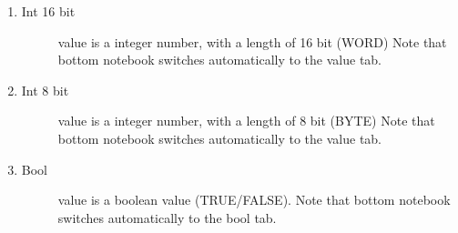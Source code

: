 \documentclass[a4paper,10pt,english]{sphinxmanual}
\begin{document}
\begin{enumerate}
\begin{description}
\begin{enumerate}
\begin{description}
\end{description}

\item {} \begin{description}
\item[{Int 16 bit}] \leavevmode
value is a integer number, with a length of 16 bit (WORD)
Note that bottom notebook switches automatically to the value tab.

\end{description}

\item {} \begin{description}
\item[{Int 8 bit}] \leavevmode
value is a integer number, with a length of 8 bit (BYTE)
Note that bottom notebook switches automatically to the value tab.

\end{description}

\item {} \begin{description}
\item[{Bool}] \leavevmode
value is a boolean value (TRUE/FALSE). Note that bottom notebook
switches automatically to the bool tab.

\end{description}

\end{enumerate}

\end{description}

\end{enumerate}
\end{document}

